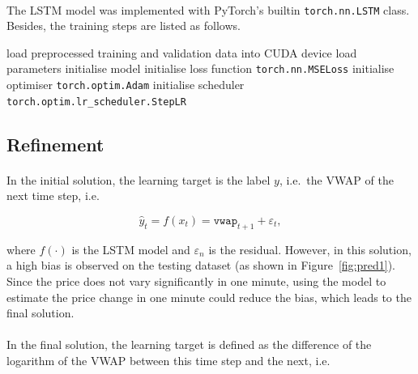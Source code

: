 \documentclass[12pt, letterpaper]{article}
\begin{document}
\paragraph{}
The LSTM model was implemented with PyTorch's builtin \texttt{torch.nn.LSTM} class. Besides, the training steps are listed as follows.

\begin{algorithm}
    load preprocessed training and validation data into CUDA device\;
    load parameters\;
    initialise model\;
    initialise loss function \texttt{torch.nn.MSELoss}\;
    initialise optimiser \texttt{torch.optim.Adam}\;
    initialise scheduler \texttt{torch.optim.lr\_scheduler.StepLR}\;
\end{algorithm}

\subsection{Refinement}\label{sec:refinement}

\paragraph{}
In the initial solution, the learning target is the label \(y\), i.e.\ the VWAP of the next time step, i.e.

\begin{equation*}
    \hat y_t=f(x_t)=\mathtt{vwap}_{t+1}+\varepsilon_t,
\end{equation*}

where \(f(\cdot)\) is the LSTM model and \(\varepsilon_n\) is the residual. However, in this solution, a high bias is observed on the testing dataset (as shown in Figure~\ref{fig:pred1}). Since the price does not vary significantly in one minute, using the model to estimate the price change in one minute could reduce the bias, which leads to the final solution.

\paragraph{}
In the final solution, the learning target is defined as the difference of the logarithm of the VWAP between this time step and the next, i.e.
\end{document}
